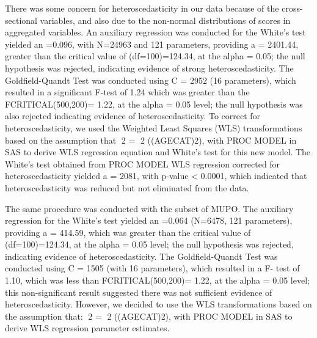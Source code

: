 \documentclass[sigconf]{acmart}
\begin{document}
There was some concern for heteroscedasticity in our data because of the 
cross-sectional variables, and also due to the non-normal distributions of 
scores in aggregated variables. An auxiliary regression was conducted for 
the White’s test yielded an =0.096, with N=24963 and 121 parameters, 
providing a  = 2401.44, greater than the critical value of (df=100)=124.34, 
at the alpha = 0.05; the null hypothesis was rejected, indicating evidence 
of strong heteroscedasticity.  The Goldfield-Quandt Test was conducted 
using C = 2952 (16 parameters), which resulted in a significant F-test of
1.24 which was greater than the FCRITICAL(500,200)= 1.22, at the alpha = 0.05 
level; the null hypothesis was also rejected indicating evidence of
heteroscedasticity. To correct for heteroscedasticity, we used the 
Weighted Least Squares (WLS) transformations based on the assumption 
that 2 = 2 ((AGECAT)2), with PROC MODEL in SAS to derive WLS regression 
equation and White’s test for this new model. The White’s test obtained 
from PROC MODEL WLS regression corrected for heteroscedasticity yielded 
a  = 2081, with p-value < 0.0001, which indicated that heteroscedasticity 
was reduced but not eliminated from the data.

The same procedure was conducted with the subset of MUPO. The auxiliary 
regression for the White’s test yielded an =0.064 (N=6478, 121 parameters), 
providing a  = 414.59, which was greater than the critical value of 
(df=100)=124.34, at the alpha = 0.05 level; the null hypothesis was 
rejected, indicating evidence of heteroscedasticity.  The Goldfield-Quandt 
Test was conducted using C = 1505 (with 16 parameters), which resulted in 
a F- test of 1.10, which was less than FCRITICAL(500,200)= 1.22, at the 
alpha = 0.05 level; this non-significant result suggested there was not 
sufficient evidence of heteroscedasticity. However, we decided to use the
WLS transformations based on the assumption that: 2 = 2 ((AGECAT)2), 
with PROC MODEL in SAS to derive WLS regression parameter estimates. 








 
\end{document}
